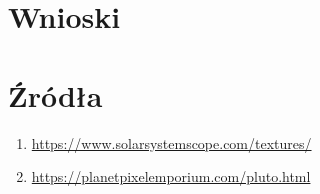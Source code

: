 \documentclass{article}
\begin{document}
    \section{Wnioski}
    \section{Źródła}
        \begin{enumerate}[label=\arabic*.]
            \item \url{https://www.solarsystemscope.com/textures/}
            \item \url{https://planetpixelemporium.com/pluto.html}
        \end{enumerate}
\end{document}
